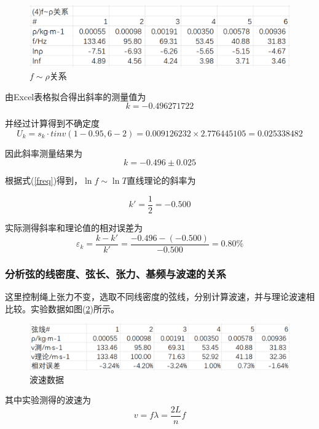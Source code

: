 \documentclass[a4paper,11pt]{article}
\begin{document}
                \begin{figure}[ht]
                    \centering
                    \includegraphics[scale=0.7]{4.f~ρ关系.png}
                    \caption{$f\sim \rho$关系}
                    \label{data4}
                \end{figure}
                
                由Excel表格拟合得出斜率的测量值为$$k=-0.496271722$$

                并经过计算得到不确定度$$U_k = s_k \cdot tinv(1-0.95, 6-2) = 0.009126232 \times 2.776445105 = 0.025338482$$

                因此斜率测量结果为$$k = -0.496 \pm 0.025$$

                根据式(\ref{freq})得到，$\ln f\sim \ln T$直线理论的斜率为

                $$k' = \dfrac 12 = -0.500$$

                实际测得斜率和理论值的相对误差为$$\varepsilon_k = \dfrac{k-k'}{k'} = \dfrac{-0.496- (-0.500)}{-0.500} = 0.80\%$$

            \subsubsection{分析弦的线密度、弦长、张力、基频与波速的关系}

                这里控制绳上张力不变，选取不同线密度的弦线，分别计算波速，并与理论波速相比较。实验数据如图(\ref{波速})所示。

                \begin{figure}[ht]
                    \centering
                    \includegraphics[scale=0.7]{波速.png}
                    \caption{波速数据}
                    \label{波速}
                \end{figure}

                其中实验测得的波速为$$v = f\lambda = \dfrac{2L}{n}f$$
\end{document}
